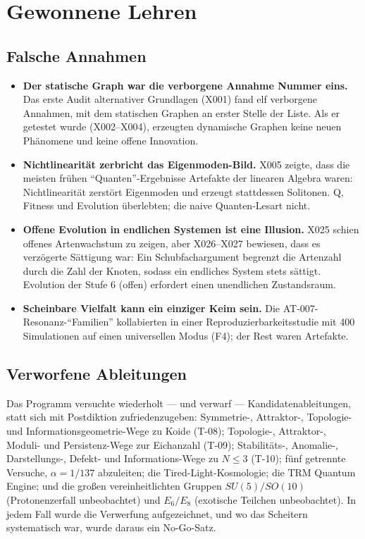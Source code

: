 \documentclass[10pt,twoside,openany]{book}
\begin{document}
\chapter{Gewonnene Lehren}
\label{ch:lessons}

\section{Falsche Annahmen}

\begin{itemize}
\item \textbf{Der statische Graph war die verborgene Annahme Nummer eins.} Das erste
Audit alternativer Grundlagen (X001) fand elf verborgene Annahmen, mit dem statischen
Graphen an erster Stelle der Liste. Als er getestet wurde (X002--X004), erzeugten
dynamische Graphen keine neuen Phänomene und keine offene Innovation.
\item \textbf{Nichtlinearität zerbricht das Eigenmoden-Bild.} X005 zeigte, dass die
meisten frühen ``Quanten''-Ergebnisse Artefakte der linearen Algebra waren:
Nichtlinearität zerstört Eigenmoden und erzeugt stattdessen Solitonen. Q, Fitness und
Evolution überlebten; die naive Quanten-Lesart nicht.
\item \textbf{Offene Evolution in endlichen Systemen ist eine Illusion.} X025 schien
offenes Artenwachstum zu zeigen, aber X026--X027 bewiesen, dass es verzögerte Sättigung
war: Ein Schubfachargument begrenzt die Artenzahl durch die Zahl der Knoten, sodass ein
endliches System stets sättigt. Evolution der Stufe 6 (offen) erfordert einen
unendlichen Zustandsraum.
\item \textbf{Scheinbare Vielfalt kann ein einziger Keim sein.} Die
AT-007-Resonanz-``Familien'' kollabierten in einer Reproduzierbarkeitsstudie mit 400
Simulationen auf einen universellen Modus (F4); der Rest waren Artefakte.
\end{itemize}

\section{Verworfene Ableitungen}

Das Programm versuchte wiederholt --- und verwarf --- Kandidatenableitungen, statt sich
mit Postdiktion zufriedenzugeben: Symmetrie-, Attraktor-, Topologie- und
Informationsgeometrie-Wege zu Koide (T-08); Topologie-, Attraktor-, Moduli- und
Persistenz-Wege zur Eichanzahl (T-09); Stabilitäts-, Anomalie-, Darstellungs-, Defekt-
und Informations-Wege zu $N\le3$ (T-10); fünf getrennte Versuche, $\alpha=1/137$
abzuleiten; die Tired-Light-Kosmologie; die TRM Quantum Engine; und die großen
vereinheitlichten Gruppen $SU(5)/SO(10)$ (Protonenzerfall unbeobachtet) und $E_6/E_8$
(exotische Teilchen unbeobachtet). In jedem Fall wurde die Verwerfung aufgezeichnet, und
wo das Scheitern systematisch war, wurde daraus ein No-Go-Satz.
\end{document}

